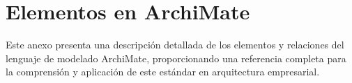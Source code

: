 

\renewcommand{\thechapter}{\Alph{chapter}}
\renewcommand{\chaptername}{Anexo}

\pagestyle{anexos}

\FloatBarrier
\chapter{Elementos en ArchiMate}\label{anexo:archimate-elementos}

Este anexo presenta una descripción detallada de los elementos y relaciones del lenguaje de modelado ArchiMate, proporcionando una referencia completa para la comprensión y aplicación de este estándar en arquitectura empresarial.



\FloatBarrier
% 



